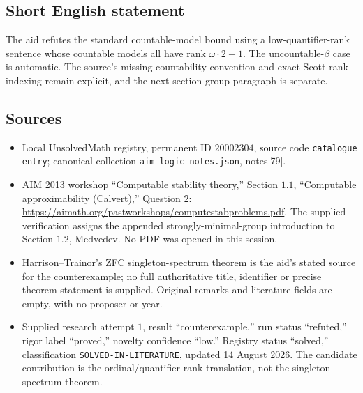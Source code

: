 \documentclass[11pt]{article}
\begin{document}
\subsection{Short English statement}
The aid refutes the standard countable-model bound using a low-quantifier-rank sentence whose countable models all have rank \(\omega\cdot2+1\). The uncountable-\(\beta\) case is automatic. The source's missing countability convention and exact Scott-rank indexing remain explicit, and the next-section group paragraph is separate.
\subsection{Sources}
\begin{itemize}
\item Local UnsolvedMath registry, permanent ID \(20002304\), source code \texttt{catalogue entry}; canonical collection \texttt{aim-logic-notes.json}, notes[79].
\item AIM 2013 workshop ``Computable stability theory,'' Section \(1.1\), ``Computable approximability (Calvert),'' Question \(2\): \url{https://aimath.org/pastworkshops/computestabproblems.pdf}. The supplied verification assigns the appended strongly-minimal-group introduction to Section \(1.2\), Medvedev. No PDF was opened in this session.
\item Harrison--Trainor's ZFC singleton-spectrum theorem is the aid's stated source for the counterexample; no full authoritative title, identifier or precise theorem statement is supplied. Original remarks and literature fields are empty, with no proposer or year.
\item Supplied research attempt \(1\), result ``counterexample,'' run status ``refuted,'' rigor label ``proved,'' novelty confidence ``low.'' Registry status ``solved,'' classification \texttt{SOLVED-IN-LITERATURE}, updated 14 August 2026. The candidate contribution is the ordinal/quantifier-rank translation, not the singleton-spectrum theorem.
\end{itemize}
\end{document}
